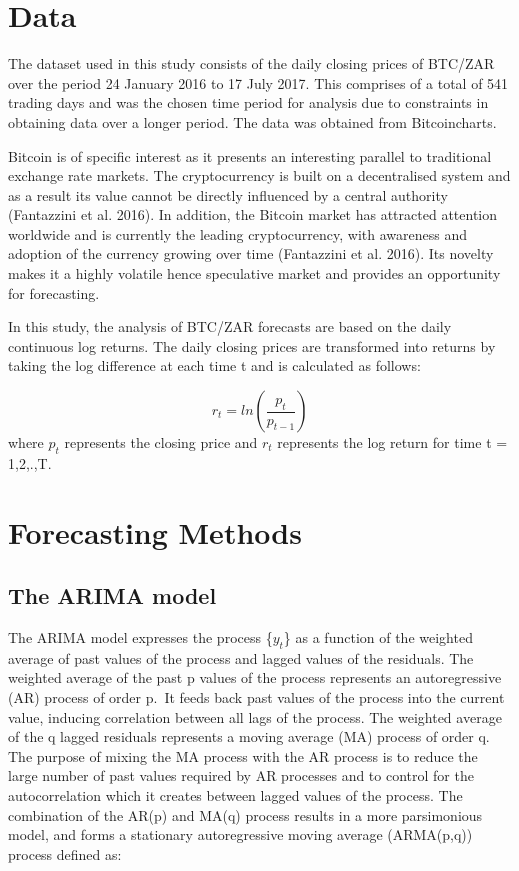 \documentclass[12pt,a4paper]{article}
\numberwithin{equation}{section}
\numberwithin{figure}{section}
\numberwithin{table}{section}
\begin{document}
\section{\texorpdfstring{Data \label{Data}}{Data }}\label{data}

The dataset used in this study consists of the daily closing prices of
BTC/ZAR over the period 24 January 2016 to 17 July 2017. This comprises
of a total of 541 trading days and was the chosen time period for
analysis due to constraints in obtaining data over a longer period. The
data was obtained from Bitcoincharts.

Bitcoin is of specific interest as it presents an interesting parallel
to traditional exchange rate markets. The cryptocurrency is built on a
decentralised system and as a result its value cannot be directly
influenced by a central authority (Fantazzini et al. 2016). In addition,
the Bitcoin market has attracted attention worldwide and is currently
the leading cryptocurrency, with awareness and adoption of the currency
growing over time (Fantazzini et al. 2016). Its novelty makes it a
highly volatile hence speculative market and provides an opportunity for
forecasting.

In this study, the analysis of BTC/ZAR forecasts are based on the daily
continuous log returns. The daily closing prices are transformed into
returns by taking the log difference at each time t and is calculated as
follows:

\[ r_t = ln(\frac{p_t}{p_{t-1}}) \] where \(p_t\) represents the closing
price and \(r_t\) represents the log return for time t = 1,2,.,T.

\section{\texorpdfstring{Forecasting Methods
\label{Forecasting Methods}}{Forecasting Methods }}\label{forecasting-methods}

\subsection{The ARIMA model}\label{the-arima-model}

The ARIMA model expresses the process \{\(y_t\)\} as a function of the
weighted average of past values of the process and lagged values of the
residuals. The weighted average of the past p values of the process
represents an autoregressive (AR) process of order p.~It feeds back past
values of the process into the current value, inducing correlation
between all lags of the process. The weighted average of the q lagged
residuals represents a moving average (MA) process of order q. The
purpose of mixing the MA process with the AR process is to reduce the
large number of past values required by AR processes and to control for
the autocorrelation which it creates between lagged values of the
process. The combination of the AR(p) and MA(q) process results in a
more parsimonious model, and forms a stationary autoregressive moving
average (ARMA(p,q)) process defined as:
\end{document}
